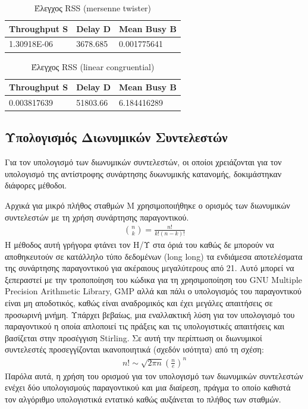 \documentclass[12pt]{report}
\begin{document}
\begin{table}[h!]
\centering
\scriptsize
\begin{tabular}{||p{2cm}|p{2cm}|p{2cm}||}
\hline
\textlatin{Throughput S} & \textlatin{Delay D} & \textlatin{Mean Busy B} \\ [0.5ex]
\hline\hline
1.30918E-06	& 3678.685 & 0.001775641\\ [1ex] 
\hline
\end{tabular}
\caption{Έλεγχος \textlatin{RSS} (\textlatin{mersenne twister})}
\label{tab02}
\end{table}

\begin{table}[h!]
\centering
\scriptsize
\begin{tabular}{||p{2cm}|p{2cm}|p{2cm}||}
\hline
\textlatin{Throughput S} & \textlatin{Delay D} & \textlatin{Mean Busy B} \\ [0.5ex]
\hline\hline
0.003817639	& 51803.66 & 6.184416289\\ [1ex] 
\hline
\end{tabular}
\caption{Έλεγχος \textlatin{RSS} (\textlatin{linear congruential})}
\label{tab03}
\end{table}

\subsection{Υπολογισμός Διωνυμικών Συντελεστών}
Για τον υπολογισμό των διωνυμικών συντελεστών, οι οποίοι χρειάζονται για τον υπολογισμό της αντίστροφης συνάρτησης δυωνυμικής κατανομής, δοκιμάστηκαν διάφορες μέθοδοι.

Αρχικά για μικρό πλήθος σταθμών \textlatin{M} χρησιμοποιήθηκε ο ορισμός των διωνυμικών συντελεστών με τη χρήση συνάρτησης παραγοντικού.
\begin{align*}
  \binom{n}{k}=\frac {n!}{k!(n-k)!}
\end{align*}
Η μέθοδος αυτή γρήγορα φτάνει τον Η/Υ στα όριά του καθώς δε μπορούν να αποθηκευτούν σε κατάλληλο τύπο δεδομένων (\textlatin{long long}) τα ενδιάμεσα αποτελέσματα της συνάρτησης παραγοντικού για ακέραιους μεγαλύτερους από 21. Αυτό μπορεί να ξεπεραστεί με την τροποποίηση του κώδικα για τη χρησιμοποίηση του \textlatin{GNU Multiple Precision Arithmetic Library, GMP} αλλά και πάλι ο υπολογισμός του παραγοντικού είναι μη αποδοτικός, καθώς είναι αναδρομικός και έχει μεγάλες απαιτήσεις σε προσωρινή μνήμη. Υπάρχει βεβαίως, μια εναλλακτική λύση για τον υπολογισμό του παραγοντικού η οποία απλοποιεί τις πράξεις και τις υπολογιστικές απαιτήσεις και βασίζεται στην προσέγγιση \textlatin{Stirling}. Σε αυτή την περίπτωση οι διωνυμικοί συντελεστές προσεγγίζονται ικανοποιητικά (σχεδόν ισότητα) από τη σχέση:
\begin{align*}
  n!\sim\sqrt{2\pi n}\left(\frac{n}{e}\right)^{n}
\end{align*}
Παρόλα αυτά, η χρήση του ορισμού για τον υπολογισμό των διωνυμικών συντελεστών ενέχει δύο υπολογισμούς παραγοντικού και μια διαίρεση, πράγμα το οποίο καθιστά τον αλγόριθμο υπολογιστικά εντατικό καθώς αυξάνεται το πλήθος των σταθμών.
\end{document}

